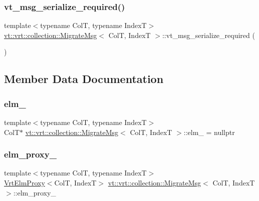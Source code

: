 \subsubsection{\texorpdfstring{vt\+\_\+msg\+\_\+serialize\+\_\+required()}{vt\_msg\_serialize\_required()}}
{\footnotesize\ttfamily template$<$typename ColT, typename IndexT$>$ \\
\hyperlink{structvt_1_1vrt_1_1collection_1_1_migrate_msg}{vt\+::vrt\+::collection\+::\+Migrate\+Msg}$<$ ColT, IndexT $>$\+::vt\+\_\+msg\+\_\+serialize\+\_\+required (\begin{DoxyParamCaption}{ }\end{DoxyParamCaption})}



\subsection{Member Data Documentation}
\mbox{\label{structvt_1_1vrt_1_1collection_1_1_migrate_msg_aa074fd362c469f1a0aae30d1cf9888bf}} 
\subsubsection{\texorpdfstring{elm\+\_\+}{elm\_}}
{\footnotesize\ttfamily template$<$typename ColT, typename IndexT$>$ \\
ColT$\ast$ \hyperlink{structvt_1_1vrt_1_1collection_1_1_migrate_msg}{vt\+::vrt\+::collection\+::\+Migrate\+Msg}$<$ ColT, IndexT $>$\+::elm\+\_\+ = nullptr}

\mbox{\label{structvt_1_1vrt_1_1collection_1_1_migrate_msg_a1c6c855daa4709e8eecda251704e9f6e}} 
\subsubsection{\texorpdfstring{elm\+\_\+proxy\+\_\+}{elm\_proxy\_}}
{\footnotesize\ttfamily template$<$typename ColT, typename IndexT$>$ \\
\hyperlink{structvt_1_1vrt_1_1collection_1_1_vrt_elm_proxy}{Vrt\+Elm\+Proxy}$<$ColT, IndexT$>$ \hyperlink{structvt_1_1vrt_1_1collection_1_1_migrate_msg}{vt\+::vrt\+::collection\+::\+Migrate\+Msg}$<$ ColT, IndexT $>$\+::elm\+\_\+proxy\+\_\+\hspace{0.3cm}{\ttfamily [private]}}

